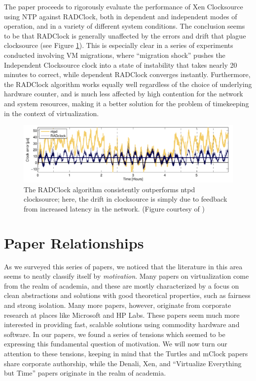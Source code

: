 \documentclass[letterpaper, twocolumn]{article}
\begin{document}
The paper proceeds to rigorously evaluate the performance of Xen Clocksource
using NTP against RADClock, both in dependent and independent modes of
operation, and in a variety of different system conditions.  The conclusion
seems to be that RADClock is generally unaffected by the errors and
drift that plague clocksource (see Figure \ref{fig:time-eval}).
This is especially clear in a series of
experiments conducted involving VM migrations, where ``migration shock''
pushes the Independent Clocksource clock into a state of instability that
takes nearly 20 minutes to correct, while dependent RADClock converges
instantly.  Furthermore, the RADClock algorithm works equally well
regardless of the choice of underlying hardware counter, and is much
less affected by high contention for the network and system resources,
making it a better solution for the problem of timekeeping in the
context of virtualization.

\begin{figure}[t]
	\caption{The RADClock algorithm consistently outperforms ntpd clocksource;
		here, the drift in clocksource is simply due to feedback from increased
		latency in the network. (Figure courtesy of \cite{ref:time})}
	\label{fig:time-eval}
	\begin{center}
		\includegraphics[width=6in]{images/time.png}
	\end{center}
\end{figure}

\section{Paper Relationships}
\label{sec:relns}

As we surveyed this series of papers, we noticed that the literature
in this area seems to neatly classify itself by \emph{motivation}.
Many papers on virtualization come from the realm of academia, and these
are mostly characterized by a focus on clean abstractions and solutions
with good theoretical properties, such as fairness and strong isolation.
Many more papers, however, originate from corporate research at places
like Microsoft and HP Labs.  These papers seem much more interested
in providing fast, scalable solutions using commodity hardware and
software.  In our papers, we found a series of tensions which seemed
to be expressing this fundamental question of motivation.  We will
now turn our attention to these tensions, keeping in mind that the
Turtles and mClock papers share corporate authorship, while the
Denali, Xen, and ``Virtualize Everything but Time'' papers originate
in the realm of academia.
\end{document}
